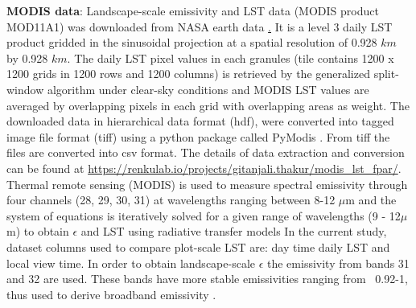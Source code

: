 \documentclass[fleqn,10pt]{wlscirep}
\begin{document}
{{\textbf{MODIS data}:
Landscape-scale emissivity and LST data (MODIS product MOD11A1) was downloaded from NASA earth data \href{https://lpdaac.usgs.gov/}. It is a level 3 daily LST product gridded in the sinusoidal projection at a spatial resolution of 0.928 $km$ by 0.928 $km$. The daily LST pixel values in each granules (tile contains 1200 x 1200 grids in 1200 rows and 1200 columns) is retrieved by the generalized split-window algorithm under clear-sky conditions and MODIS LST values are averaged by overlapping pixels in each grid with overlapping areas as weight\cite{wan2007collection}. The downloaded data in hierarchical data format (hdf), were converted into tagged image file format (tiff) using a python package called PyModis \cite{delucchi2014pymodis}. From tiff the files are converted into csv format. The details of data extraction and conversion can be found at \url{https://renkulab.io/projects/gitanjali.thakur/modis_lst_fpar/}. %
Thermal remote sensing (MODIS) is used to measure spectral emissivity through four channels (28, 29, 30, 31) at wavelengths ranging between 8-12 $\mu$m \cite{jin2006improved} and the system of equations is iteratively solved for a given range of wavelengths (9 - 12$\mu$m) to obtain $\epsilon$ and LST using radiative transfer models\cite{hulley2012quantifying,jin2006improved,wang2009evaluation} In the current study,  dataset columns used to compare plot-scale LST are: day time daily LST and local view time. In order to obtain landscape-scale $\epsilon$ the emissivity from bands 31 and 32 are used. These bands have more stable emissivities ranging from ~0.92-1, thus used to derive broadband emissivity \cite{wan2007collection}. 

}}
\end{document}
